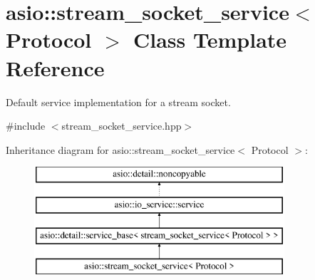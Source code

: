 \hypertarget{classasio_1_1stream__socket__service}{}\section{asio\+:\+:stream\+\_\+socket\+\_\+service$<$ Protocol $>$ Class Template Reference}
\label{classasio_1_1stream__socket__service}


Default service implementation for a stream socket.  




{\ttfamily \#include $<$stream\+\_\+socket\+\_\+service.\+hpp$>$}

Inheritance diagram for asio\+:\+:stream\+\_\+socket\+\_\+service$<$ Protocol $>$\+:\begin{figure}[H]
\begin{center}
\leavevmode
\includegraphics[height=4.000000cm]{classasio_1_1stream__socket__service}
\end{center}
\end{figure}
